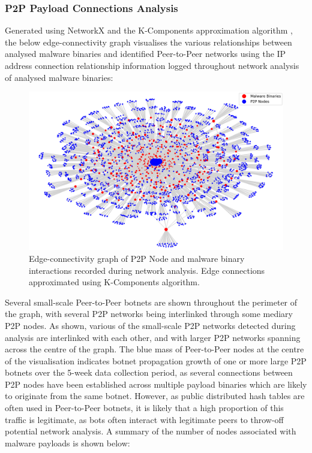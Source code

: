 \subsubsection{P2P Payload Connections Analysis} Generated using NetworkX \citep{NetworkX} and the K-Components approximation algorithm \cite{NetworkXKComponents}, the below edge-connectivity graph visualises the various relationships between analysed malware binaries and identified Peer-to-Peer networks using the IP address connection relationship information logged throughout network analysis of analysed malware binaries:

\begin{figure}[!htb]
    \centering
    \includegraphics[width=0.95\linewidth]{results/p2p_payload_network.png}
    \caption{Edge-connectivity graph of P2P Node and malware binary interactions recorded during network analysis. Edge connections approximated using K-Components algorithm.}
    \label{fig:p2p_payload_networks} 
\end{figure}

Several small-scale Peer-to-Peer botnets are shown throughout the perimeter of the graph, with several P2P networks being interlinked through some mediary P2P nodes. As shown, various of the small-scale P2P networks detected during analysis are interlinked with each other, and with larger P2P networks spanning across the centre of the graph. The blue mass of Peer-to-Peer nodes at the centre of the visualisation indicates botnet propagation growth of one or more large P2P botnets over the 5-week data collection period, as several connections between P2P nodes have been established across multiple payload binaries which are likely to originate from the same botnet. However, as public distributed hash tables are often used in Peer-to-Peer botnets, it is likely that a high proportion of this traffic is legitimate, as bots often interact with legitimate peers to throw-off potential network analysis. \citep{Herwig2019} A summary of the number of nodes associated with malware payloads is shown below:

